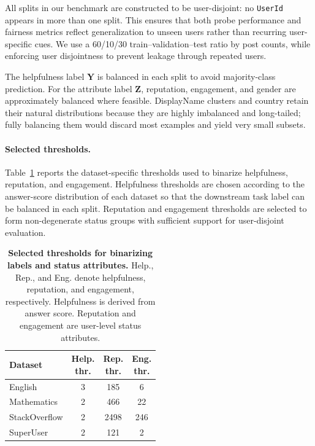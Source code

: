\documentclass[11pt]{article}
\newcommand{\rv}[1]{\mathbf{#1}}
\begin{document}
All splits in our benchmark are constructed to be user-disjoint: no \texttt{UserId} appears in more than one split. This ensures that both probe performance and fairness metrics reflect generalization to unseen users rather than recurring user-specific cues. We use a 60/10/30 train--validation--test ratio by post counts, while enforcing user disjointness to prevent leakage through repeated users.

The helpfulness label $\rv{Y}$ is balanced in each split to avoid majority-class prediction. For the attribute label $\rv{Z}$, reputation, engagement, and gender are approximately balanced where feasible. DisplayName clusters and country retain their natural distributions because they are highly imbalanced and long-tailed; fully balancing them would discard most examples and yield very small subsets.

\paragraph{Selected thresholds.}
Table~\ref{tab:selected-thresholds} reports the dataset-specific thresholds used to binarize helpfulness, reputation, and engagement. Helpfulness thresholds are chosen according to the answer-score distribution of each dataset so that the downstream task label can be balanced in each split. Reputation and engagement thresholds are selected to form non-degenerate status groups with sufficient support for user-disjoint evaluation.

\begin{table}[th!]
\centering
\begin{tabular*}{\columnwidth}{@{\extracolsep{\fill}}lccc}
\toprule
Dataset & \makecell{Help.\\thr.} & \makecell{Rep.\\thr.} & \makecell{Eng.\\thr.} \\
\midrule
English & 3 & 185 & 6 \\
Mathematics & 2 & 466 & 22 \\
StackOverflow & 2 & 2498 & 246 \\
SuperUser & 2 & 121 & 2 \\
\bottomrule
\end{tabular*}
\caption{\textbf{Selected thresholds for binarizing labels and status attributes.}
Help., Rep., and Eng. denote helpfulness, reputation, and engagement, respectively.
Helpfulness is derived from answer score. Reputation and engagement are user-level status attributes.}
\label{tab:selected-thresholds}
\end{table}
\end{document}
